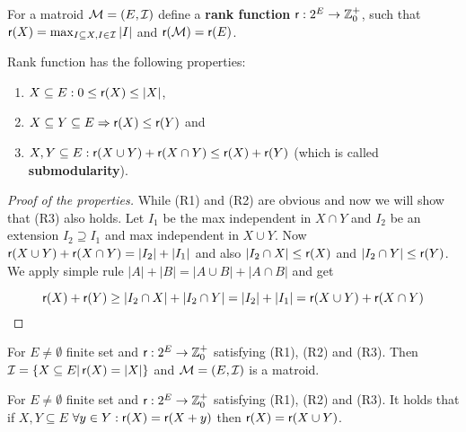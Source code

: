 \begin{defn}
	For a matroid $\mathcal{M} = (E, \mathcal{I})$ define a \textbf{rank function} $\operatorname{\textsf{r}} : 2^E \to \mathbb{Z}^+_0$, such that $\operatorname{\textsf{r}}(X) = \max_{I \subseteq X, I \in \mathcal{I}} |I|$ and $\operatorname{\textsf{r}} (\mathcal{M}) = \operatorname{\textsf{r}}(E)$.
\end{defn}

\begin{claim}
	Rank function has the following properties:
	
	\begin{enumerate}[(R1)]
		\item $X \subseteq E: 0 \leq \operatorname{\textsf{r}} (X) \leq |X|$,
		\item $X \subseteq Y \subseteq E \Rightarrow \operatorname{\textsf{r}} (X) \leq \operatorname{\textsf{r}}(Y)$ and
		\item $X, Y \subseteq E : \operatorname{\textsf{r}}(X \cup Y) + \operatorname{\textsf{r}}(X \cap Y) \leq \operatorname{\textsf{r}}(X) + \operatorname{\textsf{r}}(Y)$ (which is called \textbf{submodularity}).
	\end{enumerate}
\end{claim}

\begin{proof}[Proof of the properties]
	While (R1) and (R2) are obvious and now we will show that (R3) also holds. Let $I_1$ be the max independent in $X \cap Y$ and $I_2$ be an extension $I_2 \supseteq I_1$ and max independent in $X \cup Y$. Now $\operatorname{\textsf{r}}(X \cup Y) + \operatorname{\textsf{r}}(X \cap Y) = \left|{I_2}\right| + \left|{I_1}\right|$ and also $|I_2 \cap X| \leq \operatorname{\textsf{r}}(X)$ and $|I_2 \cap Y| \leq \operatorname{\textsf{r}}(Y)$. We apply simple rule $|A| + |B| = |A \cup B| + |A \cap B|$ and get
	
	$$
	\operatorname{\textsf{r}}(X) + \operatorname{\textsf{r}}(Y) \geq |I_2 \cap X| + |I_2 \cap Y| = |I_2| + |I_1| = \operatorname{\textsf{r}}(X \cup Y) + \operatorname{\textsf{r}}(X \cap Y)
	$$
\end{proof}

\begin{thm}
	For $E \neq \emptyset$ finite set and $\operatorname{\textsf{r}}: 2^E \to \mathbb{Z}^+_0$ satisfying (R1), (R2) and (R3). Then $\mathcal{I} = \{X \subseteq E | \operatorname{\textsf{r}}(X) = |X| \}$ and $\mathcal{M} = (E, \mathcal{I})$ is a matroid.
	\label{rank-func-thm}
\end{thm}

\begin{lemma}
	For $E \neq \emptyset$ finite set and $\operatorname{\textsf{r}}: 2^E \to \mathbb{Z}^+_0$ satisfying (R1), (R2) and (R3). It holds that if $X, Y \subseteq E$ $\forall y \in Y: \operatorname{\textsf{r}}(X) = \operatorname{\textsf{r}}(X + y)$ then $\operatorname{\textsf{r}}(X) = \operatorname{\textsf{r}}(X \cup Y)$.
	\label{rank-func-lemma}
\end{lemma}

